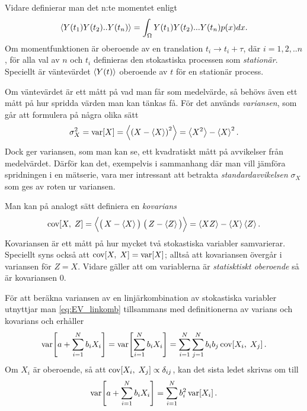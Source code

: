 Vidare definierar man det n:te momentet enligt 
\begin{equation}
    \ev{Y(t_1)Y(t_2)..Y(t_n)} = \int_{\Omega} Y(t_1)Y(t_2)...Y(t_n)p(x)dx.
\end{equation}
Om momentfunktionen är oberoende av en translation $t_i\to t_i+\tau$, där $i=1,2,..n$, för alla val av $n$ och $t_i$ definieras den stokastiska processen som \emph{stationär}. Speciellt är väntevärdet $\ev{Y(t)}$ oberoende av $t$ för en stationär process. 

Om väntevärdet är ett mått på vad man får som medelvärde, så behövs
även ett mått på hur spridda värden man kan tänkas få. För det används
\emph{variansen}, som går att formulera på några olika sätt~\cite{Rice_matstat2006}
\begin{equation}\label{eq:VAR}
\sigma_X^2=\VAR{X} = \ev{\left(X-\ev{X} \right)^2} = \ev{X^2}-\ev{X}^2.
\end{equation}
Dock ger variansen, som man kan se, ett kvadratiskt mått på
avvikelser från medelvärdet. Därför kan det, exempelvis i sammanhang
där man vill jämföra spridningen i en mätserie, vara mer intressant
att betrakta \emph{standardavvikelsen} $\sigma_X$ som ges av roten ur
variansen.


Man kan på analogt sätt definiera en \emph{kovarians}~\cite{Rice_matstat2006}
\begin{equation}\label{eq:COV}
\COV{X}{Z} 
= \Big\langle \big(\, X-\ev{X}\big)\;\big(\, Z-\ev{Z}\big) \Big\rangle
= \ev{XZ}-\ev{X}\ev{Z}.
\end{equation}
Kovariansen är ett mått på hur mycket två stokastiska variabler
samvarierar. Speciellt syns också att $\text{cov}\!\left[X,\;X\right]=\text{var}\!\left[X\right]$; alltså att
kovariansen övergår i variansen för $Z=X$. Vidare gäller att om
variablerna är \emph{statisktiskt oberoende} så är kovariansen 0.

För att beräkna variansen av en linjärkombination av stokastiska variabler utnyttjar man \eqref{eq:EV_linkomb} tillsammans med definitionerna av varians och kovarians och erhåller
\begin{equation}
\text{var}\!\left[a+\sum_{i=1}^N b_i X_i\right] = \text{var}\!\left[\sum_{i=1}^N b_i X_i\right] 
= \sum_{i=1}^N\sum_{j=1}^N b_i b_j\, \text{cov}\!\left[X_i,\;X_j\right].
\end{equation}
Om $X_i$ är oberoende, så att $\text{cov}\!\left[X_i,\;X_j\right]\propto\delta_{ij}$, kan det sista ledet skrivas om till
\begin{equation}\label{eq:VAR_linkomb}
\text{var}\!\left[a+\sum_{i=1}^N b_i X_i\right] = \sum_{i=1}^N b_i^2\, \text{var}\!\left[X_i\right].
\end{equation}




